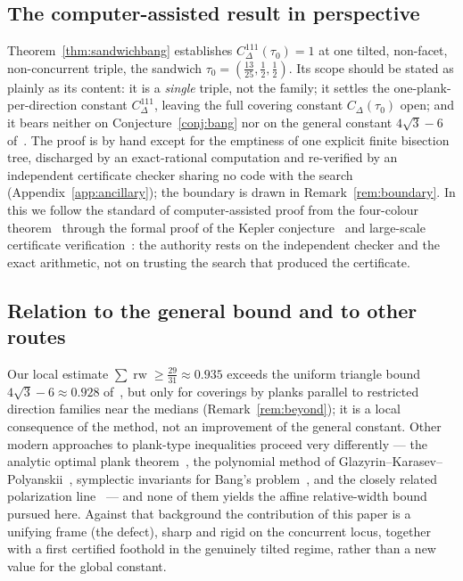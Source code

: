 \documentclass{aims}
\numberwithin{equation}{section}
\theoremstyle{plain}
\theoremstyle{definition}
\theoremstyle{remark}
\newcommand{\rw}{\operatorname{rw}}
\begin{document}
\subsection*{The computer-assisted result in perspective}
Theorem~\ref{thm:sandwichbang} establishes $C^{111}_\Delta(\tau_0)=1$ at one
tilted, non-facet, non-concurrent triple, the sandwich
$\tau_0=(\tfrac{13}{25},\tfrac12,\tfrac12)$. Its scope should be stated as
plainly as its content: it is a \emph{single} triple, not the family; it
settles the one-plank-per-direction constant $C^{111}_\Delta$, leaving the
full covering constant $C_\Delta(\tau_0)$ open; and it bears neither on
Conjecture~\ref{conj:bang} nor on the general constant $4\sqrt3-6$
of~\cite{BY26}. The proof is by hand except for the emptiness of one explicit
finite bisection tree, discharged by an exact-rational computation and
re-verified by an independent certificate checker sharing no code with the
search (Appendix~\ref{app:ancillary}); the boundary is drawn in
Remark~\ref{rem:boundary}. In this we follow the standard of computer-assisted
proof from the four-colour theorem~\cite{AppelHaken77} through the formal proof
of the Kepler conjecture~\cite{Hales17} and large-scale certificate
verification~\cite{HKM16}: the authority rests on the independent checker and
the exact arithmetic, not on trusting the search that produced the certificate.

\subsection*{Relation to the general bound and to other routes}
Our local estimate $\sum\rw\ge\tfrac{29}{31}\approx0.935$ exceeds the uniform
triangle bound $4\sqrt3-6\approx0.928$ of~\cite{BY26}, but only for coverings
by planks parallel to restricted direction families near the medians
(Remark~\ref{rem:beyond}); it is a local consequence of the method, not an
improvement of the general constant. Other modern approaches to plank-type
inequalities proceed very differently --- the analytic optimal plank
theorem~\cite{OM21}, the polynomial method of
Glazyrin--Karasev--Polyanskii~\cite{GKP22}, symplectic invariants for Bang's
problem~\cite{AKP19}, and the closely related polarization
line~\cite{Pinasco23,MOM26} --- and none of them yields the affine
relative-width bound pursued here. Against that background the contribution of
this paper is a unifying frame (the defect), sharp and rigid on the concurrent
locus, together with a first certified foothold in the genuinely tilted regime,
rather than a new value for the global constant.
\end{document}
